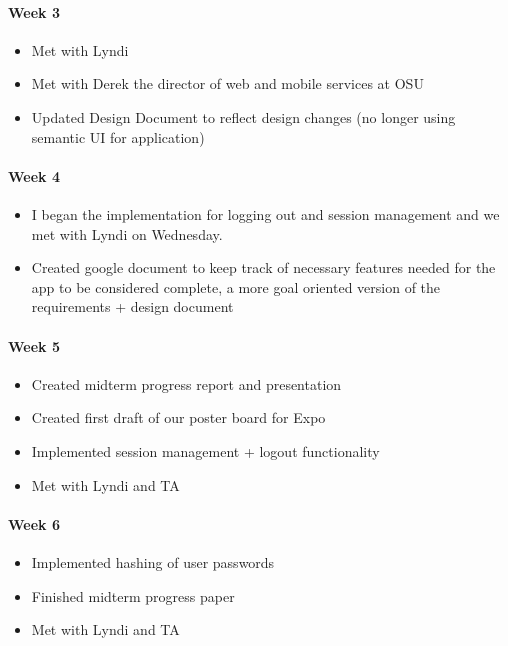 \documentclass[onecolumn, draftclsnofoot,10pt, compsoc]{IEEEtran}
\begin{document}
      \paragraph{Week 3}
        \begin{itemize}
          \item Met with Lyndi
          \item Met with Derek the director of web and mobile services at OSU
          \item Updated Design Document to reflect design changes (no longer using semantic UI for application)
        \end{itemize}

      \paragraph{Week 4}
        \begin{itemize}
          \item I began the implementation for logging out and session management and we met with Lyndi on Wednesday.
          \item Created google document to keep track of necessary features needed for the app to be considered complete, a more goal oriented version of the requirements + design document
        \end{itemize}

      \paragraph{Week 5}
        \begin{itemize}
          \item Created midterm progress report and presentation
          \item Created first draft of our poster board for Expo
          \item Implemented session management + logout functionality
          \item Met with Lyndi and TA
        \end{itemize}

      \paragraph{Week 6}
        \begin{itemize}
          \item Implemented hashing of user passwords
          \item Finished midterm progress paper
          \item Met with Lyndi and TA
        \end{itemize}
\end{document}

